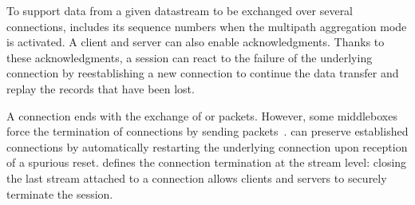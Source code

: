 To support data from a given datastream to be exchanged over several \tcp
connections, \tcpls includes its sequence numbers when the multipath aggregation
mode is activated. A client and server can also
enable acknowledgments. Thanks to these \tcpls
acknowledgments, a \tcpls session can react to the failure of the underlying
\tcp connection by reestablishing a new \tcp connection to continue the data transfer and replay the records that have been lost.

A \tcp connection ends with the exchange of \fin or \rst packets. However, some middleboxes force the termination of \tcp connections by sending \rst packets~\cite{rfc3360,weaver2009detecting}. \tcpls can preserve established connections by automatically restarting the underlying \tcp connection upon reception of a spurious reset. \tcpls defines the connection termination at the stream level: closing the last stream attached to a \tcp connection allows clients and servers to securely terminate the \tcpls session.



